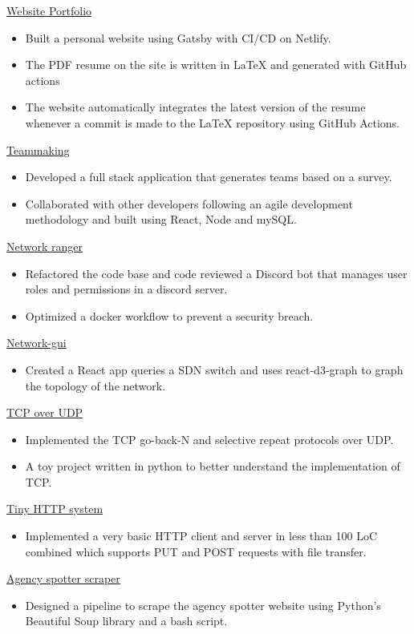 
\href{https://rsun.dev}{Website Portfolio}
\begin{itemize}
    \item Built a personal website using Gatsby with CI/CD on Netlify.
    \item The PDF resume on the site is written in \LaTeX{} and generated with GitHub actions
    \item The website automatically integrates the latest version of the resume whenever a commit is made to the \LaTeX{} repository using GitHub Actions.
\end{itemize}
    
\href{https://github.com/ngrover2/teammaking}{Teammaking}
\begin{itemize}
    \item Developed a full stack application that generates teams based on a survey.
    \item Collaborated with other developers following an agile development methodology and built using React, Node and mySQL.
\end{itemize}


\href{https://github.com/networking-discord/network-ranger}{Network ranger}
\begin{itemize}
    \item Refactored the code base and code reviewed a Discord bot that manages user roles and permissions in a discord server.
    \item Optimized  a docker workflow to prevent a security breach.
\end{itemize}
    
\href{https://github.com/rahul-sundaresan/network-gui/}{Network-gui}
\begin{itemize}
    \item Created a React app queries a SDN switch and uses react-d3-graph to graph the topology of the network.
\end{itemize}


\href{https://github.com/rahul-sundaresan/ccn-6166-p2}{TCP over UDP}
\begin{itemize}
    \item Implemented the TCP go-back-N and selective repeat protocols over UDP.
    \item  A toy project written in python to better understand the implementation of TCP.
\end{itemize}


\href{https://github.com/rahul-sundaresan/6166-project-1}{Tiny HTTP system}
\begin{itemize}
    \item Implemented a very basic HTTP client and server in less than 100 LoC combined which supports PUT and POST requests with file transfer.
\end{itemize}


\href{https://github.com/rahul-sundaresan/agency-spotter-scraper}{Agency spotter scraper}
\begin{itemize}
    \item Designed a pipeline to scrape the agency spotter website using Python's Beautiful Soup library and a bash script.
\end{itemize}

